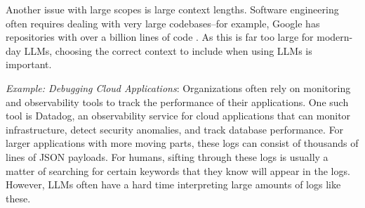 Another issue with large scopes is large context lengths. Software engineering often requires dealing with very large codebases--for example, Google has repositories with over a billion lines of code \citep{potvin2016google}. As this is far too large for modern-day LLMs, choosing the correct context to include when using LLMs is important.




\begin{tcolorbox}[colback=lightblue, boxrule=0pt, arc=5pt, outer arc=5pt, after skip=10pt plus 2pt]
\textit{Example: Debugging Cloud Applications}: Organizations often rely on monitoring and observability tools to track the performance of their applications. One such tool is Datadog, an observability service for cloud applications that can monitor infrastructure, detect security anomalies, and track database performance. For larger applications with more moving parts, these logs can consist of thousands of lines of JSON payloads. For humans, sifting through these logs is usually a matter of searching for certain keywords that they know will appear in the logs. However, LLMs often have a hard time interpreting large amounts of logs like these. 
\end{tcolorbox}


